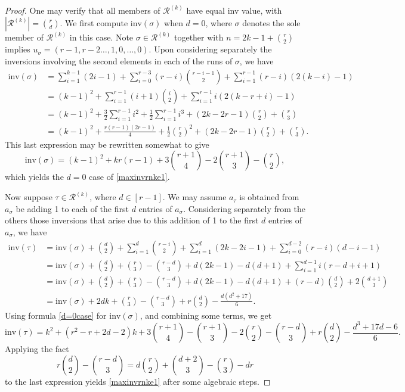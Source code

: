 \documentclass[10pt,a4paper]{amsart}
\theoremstyle{plain}
\begin{document}
\begin{proof}
One may verify that all members of $\mathcal{R}^{(k)}$ have equal inv value, with $|\mathcal{R}^{(k)}|=\binom{r}{d}$.  We first compute $\text{inv}(\sigma)$ when $d=0$, where $\sigma$ denotes the sole member of $\mathcal{R}^{(k)}$ in this case.  Note $\sigma \in \mathcal{R}^{(k)}$ together with  $n=2k-1+\binom{r}{2}$  implies $u_\sigma=(r-1,r-2\ldots,1,0,\ldots,0)$.  Upon considering separately the inversions involving the second elements in each of the runs of $\sigma$, we have
\begin{align*}
\text{inv}(\sigma)&=\sum_{i=1}^{k-1}(2i-1)+\sum_{i=0}^{r-3}(r-i)\binom{r-i-1}{2}+\sum_{i=1}^{r-1}(r-i)(2(k-i)-1)\\
&=(k-1)^2+\sum_{i=1}^{r-1}(i+1)\binom{i}{2}+\sum_{i=1}^{r-1}i(2(k-r+i)-1)\\
&=(k-1)^2+\frac{3}{2}\sum_{i=1}^{r-1}i^2+\frac{1}{2}\sum_{i=1}^{r-1}i^3 +(2k-2r-1)\binom{r}{2}+\binom{r}{3}\\
&=(k-1)^2+\frac{r(r-1)(2r-1)}{4}+\frac{1}{2}\binom{r}{2}^2+(2k-2r-1)\binom{r}{2}+\binom{r}{3}.
\end{align*}
This last expression may be rewritten somewhat to give
\begin{equation}\label{d=0case}
\text{inv}(\sigma)=(k-1)^2+kr(r-1)+3\binom{r+1}{4}-2\binom{r+1}{3}-\binom{r}{2},
\end{equation}
which yields the $d=0$ case of \eqref{maxinvrnke1}.

Now suppose $\tau \in \mathcal{R}^{(k)}$, where $d \in [r-1]$.  We may assume $a_\tau$ is obtained from $a_\sigma$ be adding 1 to each of the first $d$ entries of $a_\sigma$. Considering separately from the others those inversions that arise due to this addition of 1 to the first $d$ entries of $a_\sigma$, we have
\begin{align*}
\text{inv}(\tau)&=\text{inv}(\sigma)+\binom{d}{2}+\sum_{i=1}^d\binom{r-i}{2}+\sum_{i=1}^d(2k-2i-1)+\sum_{i=0}^{d-2}(r-i)(d-i-1)\\
&=\text{inv}(\sigma)+\binom{d}{2}+\binom{r}{3}-\binom{r-d}{3}+d(2k-1)-d(d+1)+\sum_{i=1}^{d-1}i(r-d+i+1)\\
&=\text{inv}(\sigma)+\binom{d}{2}+\binom{r}{3}-\binom{r-d}{3}+d(2k-1)-d(d+1)+(r-d)\binom{d}{2}+2\binom{d+1}{3}\\
&=\text{inv}(\sigma)+2dk+\binom{r}{3}-\binom{r-d}{3}+r\binom{d}{2}-\frac{d(d^2+17)}{6}.
\end{align*}
Using formula \eqref{d=0case} for $\text{inv}(\sigma)$, and combining some terms, we get
$$\text{inv}(\tau)=k^2+(r^2-r+2d-2)k+3\binom{r+1}{4}-\binom{r+1}{3}-2\binom{r}{2}-\binom{r-d}{3}+r\binom{d}{2}-\frac{d^3+17d-6}{6}.$$
Applying the fact
$$r\binom{d}{2}-\binom{r-d}{3}=d\binom{r}{2}+\binom{d+2}{3}-\binom{r}{3}-dr$$
to the last expression yields \eqref{maxinvrnke1} after some algebraic steps.


\end{proof}
\end{document}
